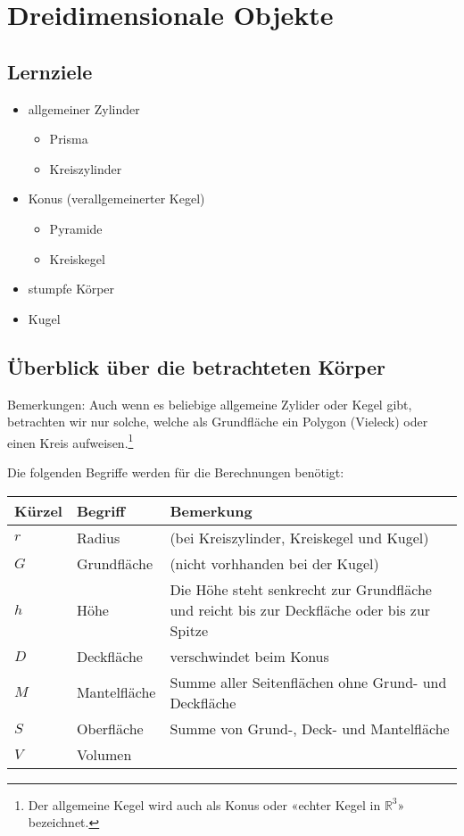 \section{Dreidimensionale Objekte}


\subsection*{Lernziele}
\begin{itemize}
\item allgemeiner Zylinder
  \begin{itemize}
  \item Prisma
  \item Kreiszylinder
    \end{itemize}
\item Konus (verallgemeinerter Kegel)
  \begin{itemize}
  \item Pyramide
  \item Kreiskegel
  \end{itemize}
  \item stumpfe Körper
  \item Kugel
\end{itemize}
\newpage
\subsection{Überblick über die betrachteten Körper}


Bemerkungen: Auch wenn es beliebige allgemeine Zylider oder Kegel
gibt, betrachten wir nur solche, welche als Grundfläche ein Polygon
(Vieleck) oder einen Kreis aufweisen.\footnote{Der allgemeine Kegel wird auch als Konus oder «echter Kegel in $\mathbb{R}^3$» bezeichnet.}

Die folgenden Begriffe werden für die Berechnungen benötigt:

\begin{tabular}{|l|l|p{12cm}|}
  \hline
  Kürzel & Begriff& Bemerkung\\\hline
  $r$  & Radius & (bei Kreiszylinder, Kreiskegel und Kugel)\\\hline
  $G$  & Grundfläche & (nicht vorhhanden bei der Kugel)\\\hline
  $h$  & Höhe & Die Höhe steht senkrecht zur Grundfläche und reicht bis zur Deckfläche oder bis zur Spitze\\\hline
  $D$  & Deckfläche & verschwindet beim Konus\\\hline
  $M$  & Mantelfläche & Summe aller Seitenflächen ohne Grund- und Deckfläche\\\hline
  $S$  & Oberfläche & Summe von Grund-, Deck- und Mantelfläche\\\hline
  $V$  & Volumen & \\\hline
  \end{tabular} 
\newpage
